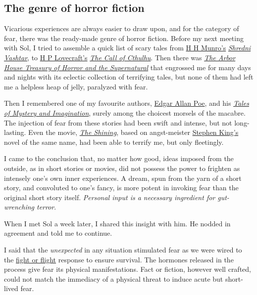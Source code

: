 \documentclass[
  a4paper,
]{article}
\begin{document}
\hypertarget{the-genre-of-horror-fiction}{%
\subsection{The genre of horror
fiction}\label{the-genre-of-horror-fiction}}

Vicarious experiences are always easier to draw upon, and for the
category of fear, there was the ready-made genre of horror fiction.
Before my next meeting with Sol, I tried to assemble a quick list of
scary tales from
\href{https://americanliterature.com/author/hh-munro-saki}{H H Munro's}
\href{https://www.classicshorts.com/stories/vashtar.html}{\emph{Shredni
Vashtar}}, to \href{https://www.hplovecraft.com/}{H P Lovecraft's}
\href{https://www.hplovecraft.com/writings/texts/fiction/cc.aspx}{\emph{The
Call of Cthulhu}}. Then there was
\href{https://openlibrary.org/books/OL4122966M/The_Arbor_House_treasury_of_horror_and_the_supernatural}{\emph{The
Arbor House Treasury of Horror and the Supernatural}} that engrossed me
for many days and nights with its eclectic collection of terrifying
tales, but none of them had left me a helpless heap of jelly, paralyzed
with fear.

Then I remembered one of my favourite authors,
\href{https://www.poetryfoundation.org/poets/edgar-allan-poe}{Edgar
Allan Poe}, and his
\href{https://www.amazon.in/Tales-Mystery-Imagination-Collins-Classics/dp/0007420226}{\emph{Tales
of Mystery and Imagination}}, surely among the choicest morsels of the
macabre. The injection of fear from these stories had been swift and
intense, but not long-lasting. Even the movie,
\href{https://www.imdb.com/title/tt0081505/}{\emph{The Shining}}, based
on angst-meister
\href{https://www.britannica.com/biography/Stephen-King}{Stephen King's}
novel of the same name, had been able to terrify me, but only
fleetingly.

I came to the conclusion that, no matter how good, ideas imposed from
the outside, as in short stories or movies, did not possess the power to
frighten as intensely one's own inner experiences. A dream, spun from
the yarn of a short story, and convoluted to one's fancy, is more potent
in invoking fear than the original short story itself. \emph{Personal
input is a necessary ingredient for gut-wrenching terror}.

When I met Sol a week later, I shared this insight with him. He nodded
in agreement and told me to continue.

I said that the \emph{unexpected} in any situation stimulated fear as we
were wired to the
\href{https://www.verywellmind.com/what-is-the-fight-or-flight-response-2795194}{fight
or flight} response to ensure survival. The hormones released in the
process give fear its physical manifestations. Fact or fiction, however
well crafted, could not match the immediacy of a physical threat to
induce acute but short-lived fear.
\end{document}

